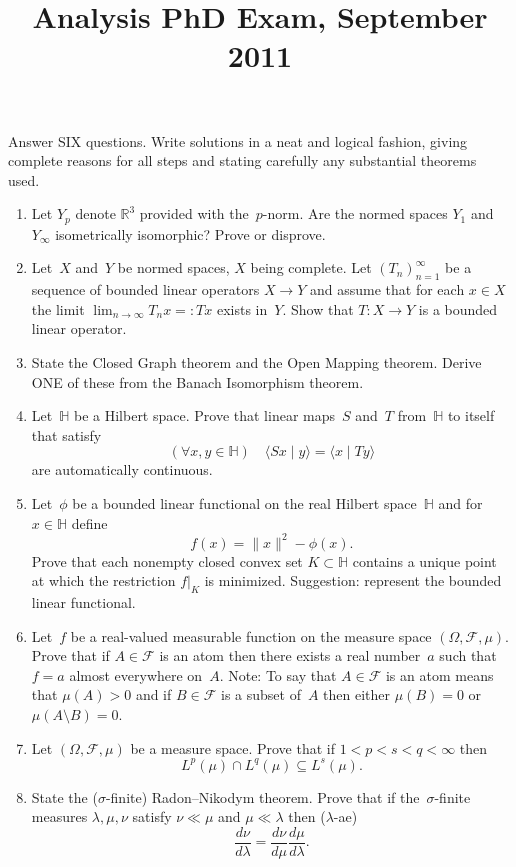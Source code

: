 \documentclass[11pt,letterpaper]{article}
\title{Analysis PhD Exam, September 2011}
\author{}
\date{}
\newenvironment{examproblems}[2]{%
  \def\ProblemHeadingTag{#2}%
  \AssignTaggingSocketPlug{block/list/label}{examproblem}%
  \begin{enumerate}%
  \setcounter{enumi}{#1}%
  \renewcommand{\labelenumi}{\textbf{\theenumi.}}%
  \setlength{\topsep}{0.35em}%
  \setlength{\partopsep}{0pt}%
  \setlength{\itemsep}{0.48em}%
  \setlength{\parsep}{0.18em}%
}{\end{enumerate}}
\newenvironment{examinstructions}{%
  \par\begingroup\itshape
}{%
  \par\endgroup\vspace{0.18em}
}
\begin{document}
\maketitle
\thispagestyle{empty}
\begin{examinstructions}
Answer SIX questions. Write solutions in a neat and logical fashion, giving complete reasons for all steps and stating carefully any substantial theorems used.
\end{examinstructions}
\begin{examproblems}{0}{H2}
\def\ProblemHeadingText{Problem 1.}
\item
Let \(Y_p\) denote \(\mathbb{R}^3\) provided with the~\(p\)-norm. Are the normed spaces \(Y_1\) and \(Y_\infty\) isometrically isomorphic? Prove or disprove.
\def\ProblemHeadingText{Problem 2.}
\item
Let~\(X\) and~\(Y\) be normed spaces, \(X\) being complete. Let \((T_n)_{n=1}^{\infty}\) be a sequence of bounded linear operators \(X \to Y\) and assume that for each \(x \in X\) the limit \(\lim_{n\to\infty} T_nx =: Tx\) exists in~\(Y\). Show that \(T:X\to Y\) is a bounded linear operator.
\def\ProblemHeadingText{Problem 3.}
\item
State the Closed Graph theorem and the Open Mapping theorem. Derive ONE of these from the Banach Isomorphism theorem.
\def\ProblemHeadingText{Problem 4.}
\item
Let~\(\mathbb{H}\) be a Hilbert space. Prove that linear maps~\(S\) and~\(T\) from~\(\mathbb{H}\) to itself that satisfy
\[
(\forall x,y\in\mathbb{H})\quad \langle Sx\mid y\rangle=\langle x\mid Ty\rangle
\]
 are automatically continuous.
\def\ProblemHeadingText{Problem 5.}
\item
Let~\(\phi\) be a bounded linear functional on the real Hilbert space~\(\mathbb{H}\) and for \(x\in\mathbb{H}\) define
\[
f(x)=\lVert x\rVert^2-\phi(x).
\]
 Prove that each nonempty closed convex set \(K\subset\mathbb{H}\) contains a unique point at which the restriction \(f|_K\) is minimized. Suggestion: represent the bounded linear functional.
\def\ProblemHeadingText{Problem 6.}
\item
Let~\(f\) be a real-valued measurable function on the measure space \((\Omega,\mathcal{F},\mu)\). Prove that if \(A\in\mathcal{F}\) is an atom then there exists a real number~\(a\) such that \(f=a\) almost everywhere on~\(A\). Note: To say that \(A\in\mathcal{F}\) is an atom means that \(\mu(A)>0\) and if \(B\in\mathcal{F}\) is a subset of~\(A\) then either \(\mu(B)=0\) or \(\mu(A\setminus B)=0\).
\def\ProblemHeadingText{Problem 7.}
\item
Let \((\Omega,\mathcal{F},\mu)\) be a measure space. Prove that if \(1<p<s<q<\infty\) then
\[
L^p(\mu)\cap L^q(\mu)\subseteq L^s(\mu).
\]
\def\ProblemHeadingText{Problem 8.}
\item
State the (\(\sigma\)-finite) Radon–Nikodym theorem. Prove that if the~\(\sigma\)-finite measures \(\lambda,\mu,\nu\) satisfy \(\nu\ll\mu\) and \(\mu\ll\lambda\) then (\(\lambda\)-ae)
\[
\frac{d\nu}{d\lambda}=\frac{d\nu}{d\mu}\frac{d\mu}{d\lambda}.
\]
\end{examproblems}
\end{document}
